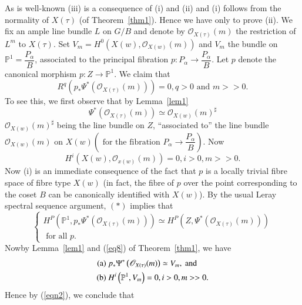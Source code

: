 \begin{Proof}
As is well-known (iii) is a consequence of (i) and (ii) and (i) follows from the normality of $X(\tau)$ (of Theorem~\ref{thm1}). Hence we have only to prove (ii). We fix an ample line bundle $L$ on $G/B$ and denote by $\mathscr{O}_{X(\tau)}(m)$ the restriction of $L^{m}$ to $X(\tau)$. Set $V_m=H^{0}(X(w), \mathscr{O}_{X(w)}(m))$ and $V_m$ the bundle on $\mathbb{P}^{1}=\dfrac{P_{\alpha}}{B}$, associated to the principal fibration $p:P_{\alpha}\to \dfrac{P_{\alpha}}{B}$. Let $p$ denote the canonical morphism $p:Z\to \mathbb{P}^{1}$. We claim that 
\begin{equation*}\label{eqn1}
R^{q}\left(p_{\ast}\Psi^{\ast}\left(\mathscr{O}_{X(\tau)}(m)\right)\right)=0, q>0 \text{ and } m> >0. \tag{1}
\end{equation*}
To see this, we first observe that by Lemma~\ref{lem1}
$$
\Psi^{\ast}\left(\mathscr{O}_{X(\tau)}(m)\right)\simeq \mathscr{O}_{X(w)}(m)^{\sharp}
$$
$\mathscr{O}_{X(w)}(m)^{\sharp}$ being the line bundle on $Z$, ``associated to'' the line bundle $\mathscr{O}_{X(w)}(m)$ on $X(w) \left(\text{ for the fibration } P_{\alpha}\to \dfrac{P_{\alpha}}{B}\right)$. 
Now
$$
H^{i}(X(w), \mathscr{O}_{x(w)}(m))=0, i>0, m>>0. 
$$
Now (i) is an immediate consequence of the fact that $p$ is a locally trivial fibre space of fibre type $X(w)$ (in fact, the fibre of $p$ over the point corresponding to the coset $B$ can be canonically identified with $X(w)$). By the usual Leray spectral sequence argument, $(\ast)$ implies that 
\begin{equation*}\label{eqn2}
\begin{cases}
H^{P}\left(\mathbb{P}^{1}, p_{\ast}\Psi^{\ast}\left(\mathscr{O}_{X(\tau)}(m)\right)\right)\simeq H^{P}\left(Z, \Psi^{\ast}\left(\mathscr{O}_{X(\tau)}(m)\right)\right)\\
\text{ for all } p.
\end{cases}\tag{2}
\end{equation*}
Now\pageoriginale by Lemma~\ref{lem1} and (\ref{eq8}) of Theorem~\ref{thm1}, we have 
\begin{equation*}
\begin{aligned}
{\rm(a)}~ &p_{\ast}\Psi^{\ast}\left(\mathscr{O}_{X(\tau)}(m)\right)\simeq V_m, \text{ and }\\
{\rm(b)}~ &{}H^{i}\left(\mathbb{P}^{1}, V_m\right)=0, i>0, m>>0.
\end{aligned}
\end{equation*}
Hence by (\ref{eqn2}), we conclude that 
\begin{equation*}\label{eqn3}

\end{equation*}
\end{Proof}

